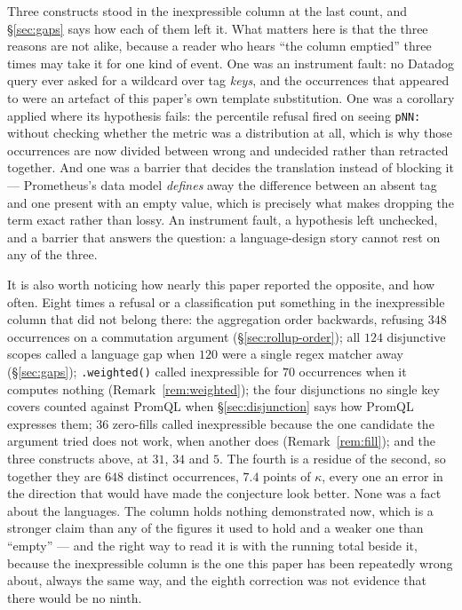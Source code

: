 Three constructs stood in the inexpressible column at the last count, and
\S\ref{sec:gaps} says how each of them left it. What matters here is that the three
reasons are not alike, because a reader who hears ``the column emptied'' three times may
take it for one kind of event. One was an instrument fault: no Datadog query ever asked
for a wildcard over tag \emph{keys}, and the occurrences that appeared to were an
artefact of this paper's own template substitution. One was a corollary applied where its
hypothesis fails: the percentile refusal fired on seeing \texttt{pNN:} without checking
whether the metric was a distribution at all, which is why those occurrences are now
divided between wrong and undecided rather than retracted together. And one was a barrier
that decides the translation instead of blocking it --- Prometheus's data model
\emph{defines} away the difference between an absent tag and one present with an empty
value, which is precisely what makes dropping the term exact rather than lossy. An
instrument fault, a hypothesis left unchecked, and a barrier that answers the question:
a language-design story cannot rest on any of the three.

It is also worth noticing how nearly this paper reported the opposite, and how often.
Eight times a refusal or a classification put something in the inexpressible column that
did not belong there: the aggregation order backwards, refusing $348$ occurrences on a
commutation argument (\S\ref{sec:rollup-order}); all $124$ disjunctive scopes called a
language gap when $120$ were a single regex matcher away (\S\ref{sec:gaps});
\texttt{.weighted()} called inexpressible for $70$ occurrences when it computes nothing
(Remark~\ref{rem:weighted}); the four disjunctions no single key covers counted
against PromQL when \S\ref{sec:disjunction} says how PromQL expresses them; $36$
zero-fills called inexpressible because the one candidate the argument tried does not
work, when another does (Remark~\ref{rem:fill}); and the three constructs above, at
$31$, $34$ and $5$. The fourth is a residue of the second, so together they are $648$
distinct occurrences, $7.4$ points of $\kappa$, every one an error in the direction that
would have made the conjecture look better. None was a fact about the languages. The column
holds nothing demonstrated now, which is a stronger claim than any of the figures it
used to hold and a weaker one than ``empty'' --- and the right way to read it is with
the running total beside it, because the inexpressible
column is the one this paper has been repeatedly wrong about, always the same way, and
the eighth correction was not evidence that there would be no ninth.

